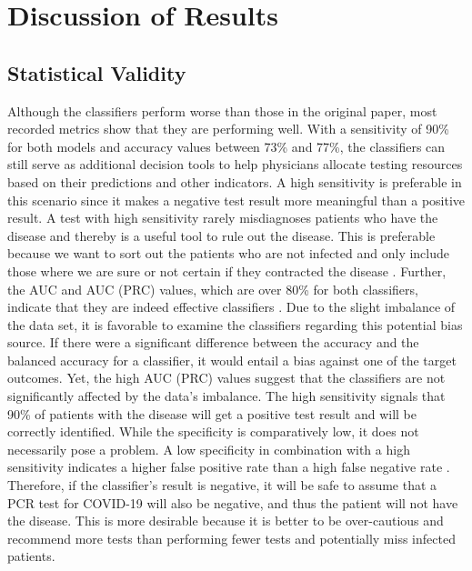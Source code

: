\section{Discussion of Results}
\subsection{Statistical Validity}
Although the classifiers perform worse than those in the original paper, 
most recorded metrics show that they are performing well.
With a sensitivity of 90\% for both models and accuracy values between 73\% and 
77\%, the classifiers can still serve as additional decision tools to help 
physicians allocate testing resources based on their 
predictions and other indicators. 
A high sensitivity is preferable in this scenario since it makes a negative test 
result more meaningful than a positive result. A test with high sensitivity 
rarely misdiagnoses patients who have the disease and thereby is a useful tool 
to rule out the disease. This is preferable because we want to sort out the 
patients who are not infected and only include those where we are sure or not 
certain if they contracted the disease \cite{RN168}.
Further, the AUC and AUC (PRC) values, which are over 80\% 
for both classifiers, indicate that they are indeed effective classifiers 
\cite{RN167}.
Due to the slight imbalance of the data set, it is  favorable to examine the 
classifiers regarding this potential bias source. If there were a 
significant difference between the accuracy and the balanced accuracy for a 
classifier, it 
would entail a bias against one of the target outcomes. Yet, the high AUC 
(PRC) values suggest that the classifiers are not significantly affected by the 
data's imbalance.
The high sensitivity signals that 90\% of 
patients with the disease will get a positive test result and will be correctly 
identified. 
While the specificity is comparatively low, it does not necessarily pose a 
problem. A low specificity in combination with a high sensitivity indicates a 
higher false positive rate than a high false negative rate \cite{RN168}.
Therefore, if the classifier's result is negative, it will be safe to 
assume that a PCR test for COVID-19 will also be negative, and thus the patient 
will not have the disease.
This is more desirable because it is better to be over-cautious and recommend 
more tests than performing fewer tests and potentially miss infected patients.
